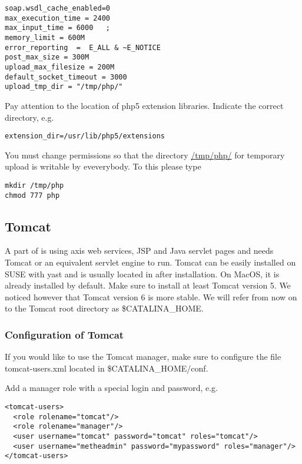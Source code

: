 \documentclass{book}
\begin{document}
\begin{footnotesize}
\begin{verbatim}
soap.wsdl_cache_enabled=0
max_execution_time = 2400
max_input_time = 6000	;
memory_limit = 600M
error_reporting  =  E_ALL & ~E_NOTICE
post_max_size = 300M
upload_max_filesize = 200M
default_socket_timeout = 3000
upload_tmp_dir = "/tmp/php/"
\end{verbatim}
\end{footnotesize}

Pay attention to the location of php5 extension libraries. Indicate the correct directory, e.g.
\begin{footnotesize}
\begin{verbatim}
extension_dir=/usr/lib/php5/extensions
\end{verbatim}
\end{footnotesize}

You must change permissions so that the directory \url{/tmp/php/} for temporary upload is writable by eveverybody. To this please type

\begin{footnotesize}
\begin{verbatim}
mkdir /tmp/php
chmod 777 php
\end{verbatim}
\end{footnotesize}


\subsection{Tomcat}

A part of \neat is using axis web services, JSP and Java servlet pages and needs Tomcat
or an equivalent servlet engine to run.
Tomcat can be easily installed on SUSE with yast and is
usually located in  after installation.
On MacOS, it is already installed by default.
Make sure to install at least Tomcat version 5.
We noticed however that Tomcat version 6 is more stable.
We will refer from now on to the Tomcat root directory as \$CATALINA\_HOME.

\subsubsection{Configuration of Tomcat}
If you would like to use the Tomcat manager, make sure to configure the file
tomcat-users.xml located in \$CATALINA\_HOME/conf.

Add a manager role with a special login and password, e.g.
\begin{footnotesize}
\begin{verbatim}
<tomcat-users>
  <role rolename="tomcat"/>
  <role rolename="manager"/>
  <user username="tomcat" password="tomcat" roles="tomcat"/>
  <user username="metheadmin" password="mypassword" roles="manager"/>
</tomcat-users>
\end{verbatim}
\end{footnotesize}
\end{document}

